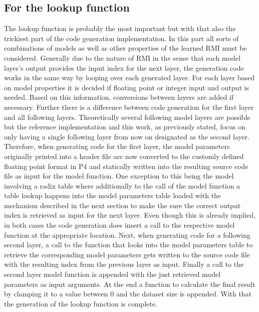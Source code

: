 \subsection{For the lookup function}
\label{sect:rmiforp4:lookup}
The lookup function is probably the most important but with that also the trickiest part of the code generation implementation. In this part all sorts of combinations of models as well as other properties of the learned RMI must be considered. Generally due to the nature of RMI in the sense that each model layer's output provides the input index for the next layer, the generation code works in the same way by looping over each generated layer. For each layer based on model properties it is decided if floating point or integer input and output is needed. Based on this information, conversions between layers are added if necessary. Further there is a difference between code generation for the first layer and all following layers. Theoretically several following model layers are possible but the reference implementation and this work, as previously stated, focus on only having a single following layer from now on designated as the second layer. Therefore, when generating code for the first layer, the model parameters originally printed into a header file are now converted to the customly defined floating point format in P4 and statically written into the resulting source code file as input for the model function. One exception to this being the model involving a radix table where additionally to the call of the model function a table lookup happens into the model parameters table loaded with the mechanism described in the next section to make the sure the correct output index is retrieved as input for the next layer. Even though this is already implied, in both cases the code generation does insert a call to the respective model function at the appropriate location. Next, when generating code for a following second layer, a call to the function that looks into the model parameters table to retrieve the corresponding model parameters gets written to the source code file with the resulting index from the previous layer as input. Finally a call to the second layer model function is appended with the just retrieved model parameters as input arguments. At the end a function to calculate the final result by clamping it to a value between 0 and the dataset size is appended. With that the generation of the lookup function is complete.

